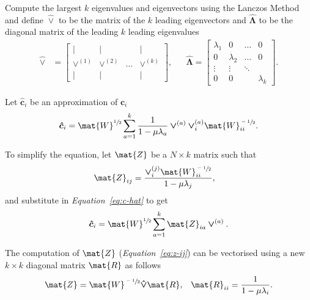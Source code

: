 \documentclass[12pt]{report}
\begin{document}
Compute the largest $k$ eigenvalues and eigenvectors using the Lanczos Method
and define $\bm{\hat{\vee}}$ to be the matrix of the $k$ leading eigenvectors
and $\bm{\hat{\Lambda}}$ to be the diagonal matrix of the leading $k$ leading
eigenvalues
\begin{align}
  \bm{\hat{\vee}} &= \begin{bmatrix}
    \vert           & \vert           &       & \vert \\
    \bm{\vee}^{(1)} & \bm{\vee}^{(2)} & \dots & \bm{\vee}^{(k)} \\
    \vert           & \vert           &       & \vert \end{bmatrix}, &&
  \bm{\hat{\Lambda}} = \begin{bmatrix}
    \lambda_1 & 0 		      & \dots  & 0 \\
    0 	 	    & \lambda_2   & \dots  & 0 \\
    \vdots 	  & \vdots	    & \ddots &   \\
    0	        & 0           &        & \lambda_k
  \end{bmatrix}.
\end{align}


Let $\bm{\hat{c}}_i$ be an approximation of $\bm{c}_i$
\begin{equation}
  \label{eq:c-hat}
  \bm{\hat{c}}_i = \mat{W}^{\sfrac{1}{2}} \sum_{a=1}^{k} \frac{1}{1 - \mu
    \lambda_a} \bm{\vee}^{(a)} \bm{\vee}^{(a)}_i \mat{W}^{\sfrac{-1}{2}}_{ii}.
\end{equation}


%
%


To simplify the equation, let $\mat{Z}$ be a $N \times k$ matrix such that
\begin{align}
  \label{eq:z-ij}
  \mat{Z}_{ij} &= \frac{\bm{\vee}^{(j)}_i \mat{W}^{\sfrac{-1}{2}}_{ii}}
    {1-\mu \lambda_j},
\end{align}
and substitute in \emph{Equation~\ref{eq:c-hat}} to get
\begin{equation}
  \label{eq:ci-rearranged-z}
  \bm{\hat{c}}_i = \mat{W}^{\sfrac{1}{2}} \sum_{a=1}^{k} \mat{Z}_{ia}
    \bm{\vee}^{(a)}.
\end{equation}

The computation of $\mat{Z}$ (\emph{Equation~\ref{eq:z-ij}}) can be vectorised
using a new $k \times k$ diagonal matrix $\mat{R}$ as follows
\begin{align}
  \label{eq:z-vectorised}
  \mat{Z} = \mat{W}^{\sfrac{-1}{2}} \bm{\hat{\vee}} \mat{R}, &&
  \mat{R}_{ii} = \frac{1}{1 - \mu \lambda_i}.
\end{align}
\end{document}

